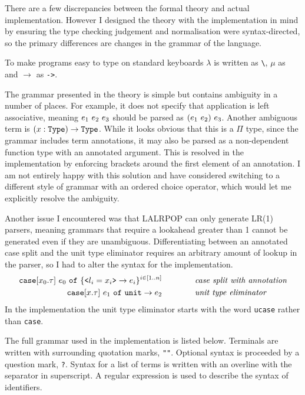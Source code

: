 \documentclass[12pt,a4paper,twoside]{report}
\begin{document}
There are a few discrepancies between the formal theory and actual implementation.
However I designed the theory with the implementation in mind by ensuring the type checking judgement and normalisation were syntax-directed, so the primary differences are changes in the grammar of the language.

To make programs easy to type on standard keyboards \(\lambda\) is written as \lstinline{\}, \(\mu\) as \texttt{\textapprox} and \(\rightarrow\) as \lstinline{->}.

The grammar presented in the theory is simple but contains ambiguity in a number of places.
For example, it does not specify that application is left associative, meaning \(e_1\ e_2\ e_3\) should be parsed as \((e_1\ e_2)\ e_3\).
Another ambiguous term is \((x : \mathtt{Type}) \rightarrow \mathtt{Type}\).
While it looks obvious that this is a \(\Pi\) type, since the grammar includes term annotations, it may also be parsed as a non-dependent function type with an annotated argument.
This is resolved in the implementation by enforcing brackets around the first element of an annotation.
I am not entirely happy with this solution and have considered switching to a different style of grammar with an ordered choice operator, which would let me explicitly resolve the ambiguity.

Another issue I encountered was that LALRPOP can only generate LR(1) parsers, meaning grammars that require a lookahead greater than 1 cannot be generated even if they are unambiguous.
Differentiating between an annotated case split and the unit type eliminator requires an arbitrary amount of lookup in the parser, so I had to alter the syntax for the implementation.
\begin{align*}
    \mathtt{case}[x_0.\tau]\ e_0\ \mathtt{of}\ \{\texttt{<} l_i = x_i \texttt{>} \rightarrow e_i\}^{i \in [1 \mathinner{\ldotp \ldotp} n]} \qquad\qquad&\textit{case split with annotation} \\
    \texttt{case}[x.\tau]\ e_1\ \texttt{of}\ \texttt{unit} \rightarrow e_2 \qquad\qquad&\textit{unit type eliminator}
\end{align*}
In the implementation the unit type eliminator starts with the word \texttt{ucase} rather than \texttt{case}.

The full grammar used in the implementation is listed below.
Terminals are written with surrounding quotation marks, \texttt{""}.
Optional syntax is proceeded by a question mark, \texttt{?}.
Syntax for a list of terms is written with an overline with the separator in superscript.
A regular expression is used to describe the syntax of identifiers.
\concretesyntax
\end{document}
